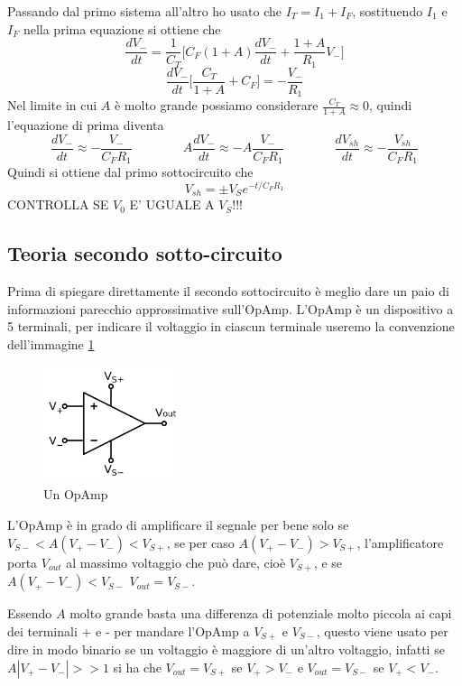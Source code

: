 \documentclass{article}
\begin{document}
			Passando dal primo sistema all'altro ho usato che $I_T=I_1+I_F$, sostituendo $I_1$ e $I_F$ nella prima equazione si ottiene che
			\[
				\frac{dV_-}{dt}=\frac{1}{C_T}\bigg[C_F(1+A)\frac{dV_-}{dt}+\frac{1+A}{R_1}V_-\bigg]
			\]
			\[
				\frac{dV_-}{dt}\bigg[\frac{C_T}{1+A}+C_F\bigg]=-\frac{V_-}{R_1}
			\]
			Nel limite in cui $A$ è molto grande possiamo considerare $\frac{C_T}{1+A}\approx0$, quindi l'equazione di prima diventa
			\[
				\frac{dV_-}{dt}\approx-\frac{V_-}{C_FR_1}\qquad\qquad
				A\frac{dV_-}{dt}\approx-A\frac{V_-}{C_FR_1}\qquad\qquad
				\frac{dV_{sh}}{dt}\approx-\frac{V_{sh}}{C_FR_1}
			\]
			Quindi si ottiene dal primo sottocircuito che\newline
			\begin{equation}
				V_{sh}=\pm V_Se^{-t/C_FR_1}
			\end{equation}
			CONTROLLA SE $V_0$ E' UGUALE A $V_S$!!!
		\subsection{Teoria secondo sotto-circuito}
			Prima di spiegare direttamente il secondo sottocircuito è meglio dare un paio di informazioni parecchio approssimative sull'OpAmp.\newline
			L'OpAmp è un dispositivo a 5 terminali, per indicare il voltaggio in ciascun terminale useremo la convenzione dell'immagine \ref{fig:OpAmp1}\newline
			\begin{figure}
				\label{fig:OpAmp1}
				\centering
				\includegraphics[width=40mm]{immagini/OpAmp1.png}
				\caption{Un OpAmp}
			\end{figure}
			L'OpAmp è in grado di amplificare il segnale per bene solo se $V_{S-}<A(V_+-V_-)<V_{S+}$, se per caso $A(V_+-V_-)>V_{S+}$, l'amplificatore porta $V_{out}$ al massimo voltaggio che può dare, cioè $V_{S+}$, e se $A(V_+-V_-)<V_{S-}$ $V_{out}=V_{S-}$.\newline

			Essendo $A$ molto grande basta una differenza di potenziale molto piccola ai capi dei terminali + e - per mandare l'OpAmp a $V_{S+}$ e $V_{S-}$, questo viene usato per dire in modo binario se un voltaggio è maggiore di un'altro voltaggio, infatti se $A|V_+-V_-|>>1$ si ha che $V_{out}=V_{S+}$ se $V_+>V_-$ e $V_{out}=V_{S-}$ se $V_+<V_-$.\newline
\end{document}
